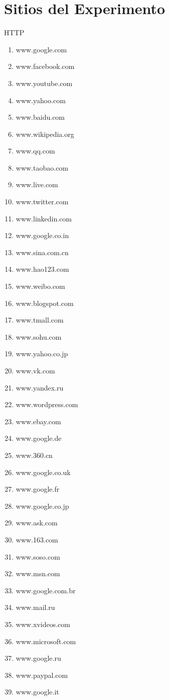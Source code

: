 \chapter{Sitios del Experimento}
HTTP
\begin{enumerate}
\item www.google.com
\item www.facebook.com
\item www.youtube.com
\item www.yahoo.com
\item www.baidu.com
\item www.wikipedia.org
\item www.qq.com
\item www.taobao.com
\item www.live.com
\item www.twitter.com
\item www.linkedin.com
\item www.google.co.in
\item www.sina.com.cn
\item www.hao123.com
\item www.weibo.com
\item www.blogspot.com
\item www.tmall.com
\item www.sohu.com
\item www.yahoo.co.jp
\item www.vk.com
\item www.yandex.ru
\item www.wordpress.com
\item www.ebay.com
\item www.google.de
\item www.360.cn
\item www.google.co.uk
\item www.google.fr
\item www.google.co.jp
\item www.ask.com
\item www.163.com
\item www.soso.com
\item www.msn.com
\item www.google.com.br
\item www.mail.ru
\item www.xvideos.com
\item www.microsoft.com
\item www.google.ru
\item www.paypal.com
\item www.google.it

\end{enumerate}
